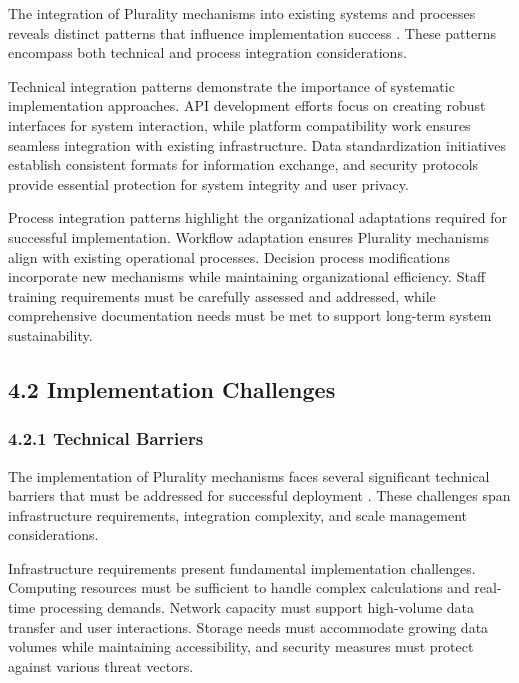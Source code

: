 The integration of Plurality mechanisms into existing systems and processes reveals distinct patterns that influence implementation success \citep{polis2024}. These patterns encompass both technical and process integration considerations.

Technical integration patterns demonstrate the importance of systematic implementation approaches. API development efforts focus on creating robust interfaces for system interaction, while platform compatibility work ensures seamless integration with existing infrastructure. Data standardization initiatives establish consistent formats for information exchange, and security protocols provide essential protection for system integrity and user privacy.

Process integration patterns highlight the organizational adaptations required for successful implementation. Workflow adaptation ensures Plurality mechanisms align with existing operational processes. Decision process modifications incorporate new mechanisms while maintaining organizational efficiency. Staff training requirements must be carefully assessed and addressed, while comprehensive documentation needs must be met to support long-term system sustainability.

\hypertarget{implementation-challenges}{%
\subsection{4.2 Implementation Challenges}\label{implementation-challenges}}

\hypertarget{technical-barriers}{%
\subsubsection{4.2.1 Technical Barriers}\label{technical-barriers}}

The implementation of Plurality mechanisms faces several significant technical barriers that must be addressed for successful deployment \citep{communitynotes2024}. These challenges span infrastructure requirements, integration complexity, and scale management considerations.

Infrastructure requirements present fundamental implementation challenges. Computing resources must be sufficient to handle complex calculations and real-time processing demands. Network capacity must support high-volume data transfer and user interactions. Storage needs must accommodate growing data volumes while maintaining accessibility, and security measures must protect against various threat vectors.

